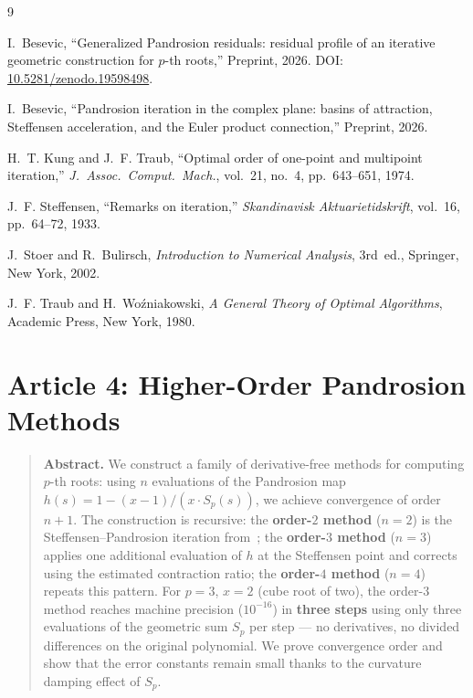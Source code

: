 \documentclass[10pt,a4paper,oneside]{book}
\theoremstyle{definition}
\theoremstyle{remark}
\newenvironment{abstract}{\begin{quote}\small\textbf{Abstract.}}{\end{quote}}
\begin{document}
\begin{thebibliography}{9}

I.~Besevic,
``Generalized Pandrosion residuals: residual profile of an iterative geometric construction for $p$-th roots,''
Preprint, 2026.
DOI: \href{https://doi.org/10.5281/zenodo.19598498}{10.5281/zenodo.19598498}.

I.~Besevic,
``Pandrosion iteration in the complex plane: basins of attraction, Steffensen acceleration, and the Euler product connection,''
Preprint, 2026.

H.~T. Kung and J.~F. Traub,
``Optimal order of one-point and multipoint iteration,''
\textit{J.~Assoc.\ Comput.\ Mach.}, vol.~21, no.~4, pp.~643--651, 1974.

J.~F. Steffensen,
``Remarks on iteration,''
\textit{Skandinavisk Aktuarietidskrift}, vol.~16, pp.~64--72, 1933.

J.~Stoer and R.~Bulirsch,
\textit{Introduction to Numerical Analysis},
3rd~ed., Springer, New York, 2002.

J.~F. Traub and H.~Wo\'{z}niakowski,
\textit{A General Theory of Optimal Algorithms},
Academic Press, New York, 1980.

\end{thebibliography}





\chapter{Article 4: Higher-Order Pandrosion Methods}
\graphicspath{{../figures/}}


\begin{abstract}
We construct a family of derivative-free methods for computing $p$-th roots: using $n$ evaluations of the Pandrosion map $h(s) = 1 - (x-1)/(x\cdot S_p(s))$, we achieve convergence of order $n+1$.  The construction is recursive: the \textbf{order-$2$ method} ($n=2$) is the Steffensen--Pandrosion iteration from~\cite{besevic2026}; the \textbf{order-$3$ method} ($n=3$) applies one additional evaluation of $h$ at the Steffensen point and corrects using the estimated contraction ratio; the \textbf{order-$4$ method} ($n=4$) repeats this pattern.  For $p=3$, $x=2$ (cube root of two), the order-$3$ method reaches machine precision ($10^{-16}$) in \textbf{three steps} using only three evaluations of the geometric sum $S_p$ per step --- no derivatives, no divided differences on the original polynomial.  We prove convergence order and show that the error constants remain small thanks to the curvature damping effect of $S_p$.
\end{abstract}
\end{document}
